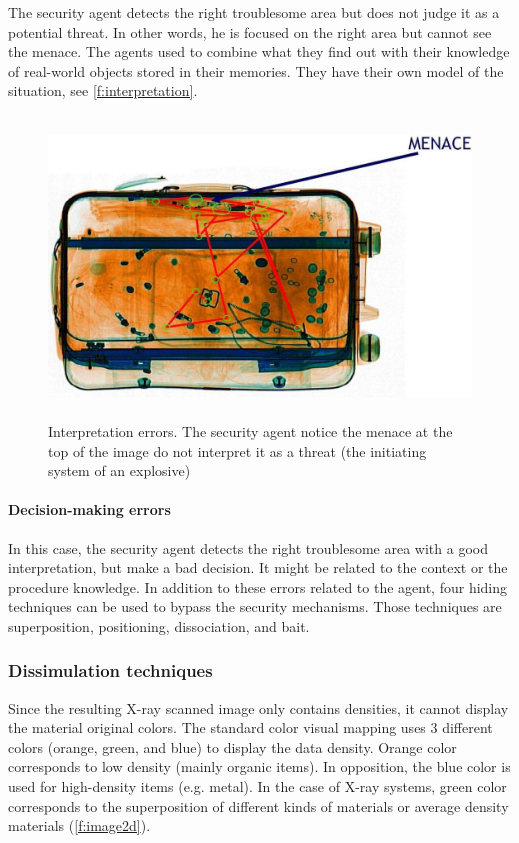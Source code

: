 The security agent detects the right troublesome area but does not judge it as a potential threat. In other words, he is focused on the right area but cannot see the menace. The agents used to combine what they find out with their knowledge of real-world objects stored in their memories. They have their own model of the situation, see  \autoref{f:interpretation}.
\begin{figure}
\centering
	\includegraphics[height=8cm]{Figures/interpretationError}
	\caption{Interpretation errors. The security agent notice the menace at the top of the image do not interpret it as a threat (the initiating system of an explosive)}
	\label{f:interpretation}
\end{figure}

\paragraph{ Decision-making errors}
In this case, the security agent detects the right troublesome area with a good interpretation, but make a bad decision. It might be related to the context or the procedure knowledge.
In addition to these errors related to the agent, four hiding techniques can be used to bypass the security mechanisms. Those techniques are superposition, positioning, dissociation, and bait.

\subsubsection{ Dissimulation techniques }
Since the resulting X-ray scanned image only contains densities, it cannot display the material original colors. The standard color visual mapping uses 3 different colors (orange, green, and blue) to display the data density. Orange color corresponds to low density (mainly organic items). In opposition, the blue color is used for high-density items (e.g. metal). In the case of X-ray systems, green color corresponds to the superposition of different kinds of materials or average density materials (\autoref{f:image2d}). 

